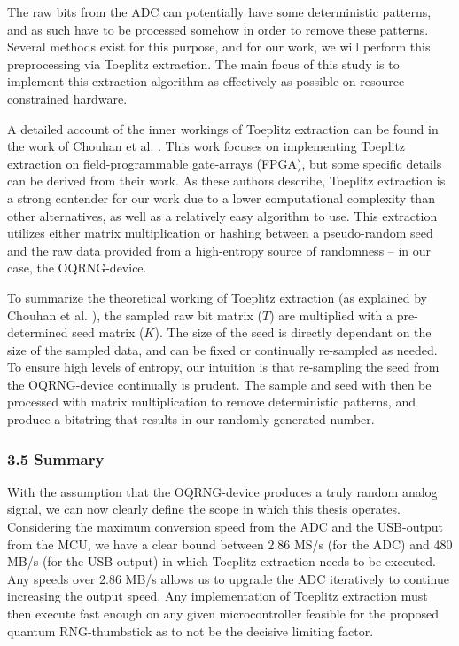 The raw bits from the ADC can potentially have some deterministic patterns, and as such have to be processed somehow in order to remove these patterns. Several methods exist for this purpose, and for our work, we will perform this preprocessing via Toeplitz extraction. The main focus of this study is to implement this extraction algorithm as effectively as possible on resource constrained hardware.

A detailed account of the inner workings of Toeplitz extraction can be found in the work of Chouhan et al. \cite{toeplitz-desc}. This work focuses on implementing Toeplitz extraction on field-programmable gate-arrays (FPGA), but some specific details can be derived from their work. As these authors describe, Toeplitz extraction is a strong contender for our work due to a lower computational complexity than other alternatives, as well as a relatively easy algorithm to use. This extraction utilizes either matrix multiplication or hashing between a pseudo-random seed and the raw data provided from a high-entropy source of randomness -- in our case, the OQRNG-device.

To summarize the theoretical working of Toeplitz extraction (as explained by Chouhan et al. \cite{toeplitz-desc}), the sampled raw bit matrix (\(T\)) are multiplied with a pre-determined seed matrix (\(K\)). The size of the seed is directly dependant on the size of the sampled data, and can be fixed or continually re-sampled as needed. To ensure high levels of entropy, our intuition is that re-sampling the seed from the OQRNG-device continually is prudent. The sample and seed with then be processed with matrix multiplication to remove deterministic patterns, and produce a bitstring that results in our randomly generated number.

\subsubsection{3.5 Summary}\label{summary}

With the assumption that the OQRNG-device produces a truly random analog signal, we can now clearly define the scope in which this thesis operates. Considering the maximum conversion speed from the ADC and the USB-output from the MCU, we have a clear bound between 2.86 MS/s (for the ADC) and 480 MB/s (for the USB output) in which Toeplitz extraction needs to be executed. Any speeds over 2.86 MB/s allows us to upgrade the ADC iteratively to continue increasing the output speed. Any implementation of Toeplitz extraction must then execute fast enough on any given microcontroller feasible for the proposed quantum RNG-thumbstick as to not be the decisive limiting factor.

